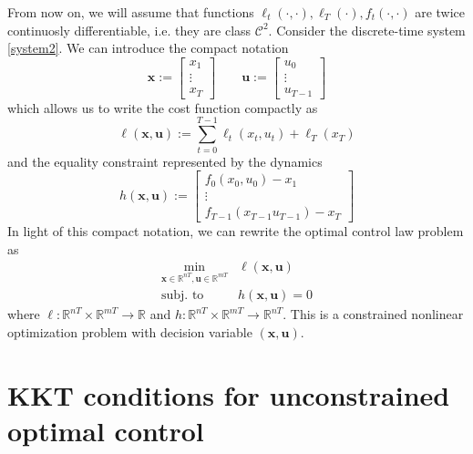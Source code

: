 \documentclass[openany]{book}
\newcommand{\R}{\mathbb{R}}               %
\theoremstyle{definition}
\theoremstyle{remark}
\begin{document}
From now on, we will assume that functions $\ell_t(\cdot,\cdot),\ell_T(\cdot),f_t(\cdot,\cdot)$ are twice continuosly differentiable, i.e. they are class $\mathcal{C}^2$.
Consider the discrete-time system \eqref{system2}. We can introduce the compact notation 
\[
    \mathbf{x} := \begin{bmatrix}
        x_1 \\ \vdots \\ x_T
    \end{bmatrix} \qquad \mathbf{u} := \begin{bmatrix}
        u_0 \\ \vdots \\ u_{T-1}
    \end{bmatrix}
\]
which allows us to write the cost function compactly as 
\[
    \ell({\mathbf{x},\mathbf{u}}) := \sum_{t=0}^{T-1}\ell_t(x_t,u_t)+\ell_T(x_T)
\]
and the equality constraint represented by the dynamics 
\[
    h(\mathbf{x},\mathbf{u}) := \begin{bmatrix}
        f_0(x_0,u_0)-x_1 \\ \vdots \\ f_{T-1}(x_{T-1}u_{T-1})-x_T
    \end{bmatrix}
\]
In light of this compact notation, we can rewrite the optimal control law problem as 
\begin{align*}
    \min_{\mathbf{x}\in\R^{nT},\mathbf{u}\in\R^{mT}} &\ell(\mathbf{x},\mathbf{u})\\
    \text{subj. to } & h(\mathbf{x},\mathbf{u})=0
\end{align*}
where $\ell:\R^{nT}\times\R^{mT}\to\R$ and $h:\R^{nT}\times\R^{mT}\to\R^{nT}$. This is a constrained nonlinear optimization problem with decision variable $(\mathbf{x},\mathbf{u})$.


\section{KKT conditions for unconstrained optimal control}
\end{document}
